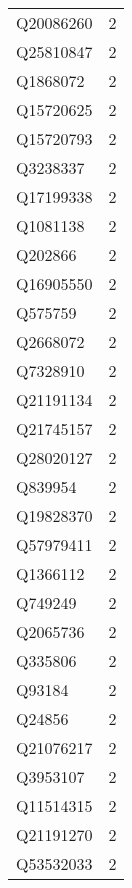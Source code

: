 \begin{tabular}{lr}
   Q20086260 &                             2 \\
   Q25810847 &                             2 \\
    Q1868072 &                             2 \\
   Q15720625 &                             2 \\
   Q15720793 &                             2 \\
    Q3238337 &                             2 \\
   Q17199338 &                             2 \\
    Q1081138 &                             2 \\
     Q202866 &                             2 \\
   Q16905550 &                             2 \\
     Q575759 &                             2 \\
    Q2668072 &                             2 \\
    Q7328910 &                             2 \\
   Q21191134 &                             2 \\
   Q21745157 &                             2 \\
   Q28020127 &                             2 \\
     Q839954 &                             2 \\
   Q19828370 &                             2 \\
   Q57979411 &                             2 \\
    Q1366112 &                             2 \\
     Q749249 &                             2 \\
    Q2065736 &                             2 \\
     Q335806 &                             2 \\
      Q93184 &                             2 \\
      Q24856 &                             2 \\
   Q21076217 &                             2 \\
    Q3953107 &                             2 \\
   Q11514315 &                             2 \\
   Q21191270 &                             2 \\
   Q53532033 &                             2 \\

\end{tabular}
